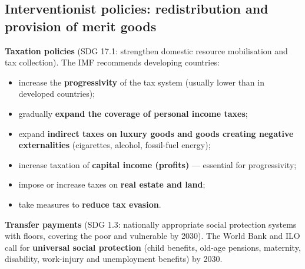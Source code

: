 \subsection{Interventionist policies: redistribution and provision of merit goods}
\textbf{Taxation policies} (SDG 17.1: strengthen domestic resource mobilisation and tax collection). The IMF recommends developing countries:
\begin{itemize}
  \item increase the \textbf{progressivity} of the tax system (usually lower than in developed countries);
  \item gradually \textbf{expand the coverage of personal income taxes};
  \item expand \textbf{indirect taxes on luxury goods and goods creating negative externalities} (cigarettes, alcohol, fossil-fuel energy);
  \item increase taxation of \textbf{capital income (profits)} --- essential for progressivity;
  \item impose or increase taxes on \textbf{real estate and land};
  \item take measures to \textbf{reduce tax evasion}.
\end{itemize}
\textbf{Transfer payments} (SDG 1.3: nationally appropriate social protection systems with floors, covering the poor and vulnerable by 2030). The World Bank and ILO call for \textbf{universal social protection} (child benefits, old-age pensions, maternity, disability, work-injury and unemployment benefits) by 2030.
